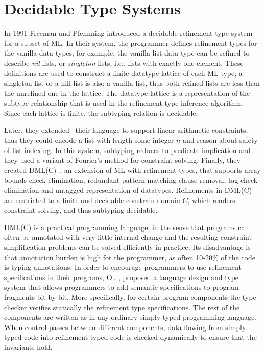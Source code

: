 \newcommand\qset{\ensuremath{\mathbb{Q}}\xspace}
\newcommand\NV[1]{\columnbreak}


\section{Decidable Type Systems}\label{sec:liquid}
In 1991 Freeman and Pfennning \cite{FreemanPfenning91} introduced
a decidable refinement type system for a subset of ML.
%
In their system, the programmer defines refinement
types for the vanilla data types; 
for example, the vanilla 
list data type can be refined to 
describe \textit{nil} lists, or \textit{singleton} lists, i.e., lists
with exactly one element.
%
These definitions are used to 
construct a finite datatype lattice of each ML type;
a singleton list or a nill list is
also a vanilla list, thus both refined lists are 
less than the unrefined one in the lattice.
%
The datatype lattice is a representation of the subtype
relationship that is used in the 
refinement type inference algorithm. 
Since each lattice is finite, the 
subtyping relation is decidable.

Later, 
they extended~\cite{pfenningxi98} their language to support
linear arithmetic constraints; thus they could
encode a list with length some integer $n$ and 
reason about safety of list indexing.
In this system, subtyping reduces to predicate implication
and they used a variant of Fourier's method \cite{OmegaTestCACM} 
for constraint solving.
%
Finally, they created DML(C)~\cite{XiPfenning99}, 
an extension of ML with refinement types, that supports 
array bounds check elimination,
redundant pattern matching clause removal, 
tag check elimination and untagged representation of datatypes.
%
Refinements in DML(C) are restricted to a finite and decidable
constrain domain $C$, 
which renders constraint solving, and thus subtyping decidable.
%

DML(C)  is a practical programming language, in the sense that 
programs can often be annotated with
very little internal change and the resulting
constraint simplification problems can be solved efficiently
in practice. 
%
Its disadvantage is that annotation burden is high for the programmer,  
as often 10-20\% of
the code is typing annotations.
%
In order to encourage programmers to use refinement specifications in their programs,
Ou \etal \cite{Ou2004}, proposed a language design and type system that allows programmers to add
semantic specifications to program fragments bit by bit. 
More specifically, for certain program components the type checker verifies
statically the refinement type specifications.
%
The rest of the components are written as in any ordinary simply-typed programming language. 
When control passes between different components, data flowing
from simply-typed code into refinement-typed code is checked dynamically 
to ensure that the invariants hold.
%

